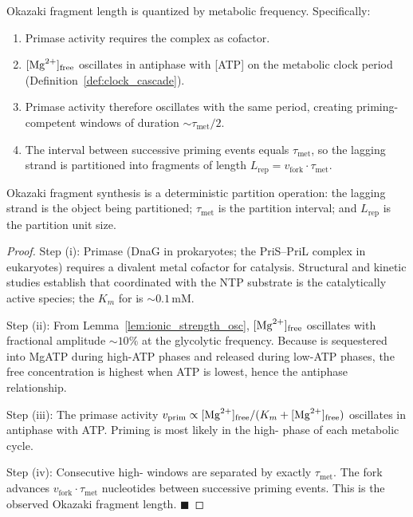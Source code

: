\begin{theorem}
\label{thm:okazaki_quantization}
Okazaki fragment length is quantized by metabolic frequency. Specifically:
\begin{enumerate}[label=(\roman*)]
  \item Primase activity requires the  complex as cofactor.
  \item $[\ce{Mg^{2+}}]_{\mathrm{free}}$ oscillates in antiphase with [ATP]
        on the metabolic clock period (Definition~\ref{def:clock_cascade}).
  \item Primase activity therefore oscillates with the same period,
        creating priming-competent windows of duration $\sim\tau_{\mathrm{met}}/2$.
  \item The interval between successive priming events equals $\tau_{\mathrm{met}}$,
        so the lagging strand is partitioned into fragments of length
        $L_{\mathrm{rep}} = v_{\mathrm{fork}} \cdot \tau_{\mathrm{met}}$.
\end{enumerate}
Okazaki fragment synthesis is a deterministic partition operation: the lagging
strand is the object being partitioned; $\tau_{\mathrm{met}}$ is the partition
interval; and $L_{\mathrm{rep}}$ is the partition unit size.
\end{theorem}

\begin{proof}
Step (i): Primase (DnaG in prokaryotes; the PriS--PriL complex in eukaryotes)
requires a divalent metal cofactor for catalysis. Structural and kinetic studies
establish that  coordinated with the NTP substrate is the
catalytically active species; the $K_m$ for  is $\sim 0.1$\,mM.

Step (ii): From Lemma~\ref{lem:ionic_strength_osc}, $[\ce{Mg^{2+}}]_{\mathrm{free}}$
oscillates with fractional amplitude $\sim 10\%$ at the glycolytic frequency.
Because  is sequestered into MgATP during high-ATP phases and
released during low-ATP phases, the free concentration is highest when ATP
is lowest, hence the antiphase relationship.

Step (iii): The primase activity $v_{\mathrm{prim}} \propto [\ce{Mg^{2+}}]_{\mathrm{free}}/(K_m + [\ce{Mg^{2+}}]_{\mathrm{free}})$ oscillates in antiphase with ATP. Priming is most likely in the high- phase of each metabolic cycle.

Step (iv): Consecutive high- windows are separated by exactly
$\tau_{\mathrm{met}}$. The fork advances $v_{\mathrm{fork}} \cdot \tau_{\mathrm{met}}$
nucleotides between successive priming events. This is the observed Okazaki
fragment length. $\blacksquare$
\end{proof}

